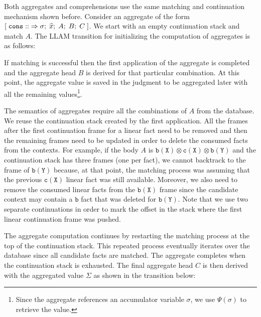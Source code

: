 Both aggregates and comprehensions use the same matching and continuation
mechanism shown before.  Consider an aggregate of the form
$[\; \mathtt{cons ::} \Rightarrow \sigma; \; \widehat{x}; \; A; \; B; \; C \;]$. We start with an
empty continuation stack and match $A$.  The LLAM transition for initializing
the computation of aggregates is as follows:



If matching is successful then the first application of the aggregate is
completed and the aggregate head $B$ is derived for that particular combination.
At this point, the aggregate value is saved in the judgment to be aggregated
later with all the remaining values\footnote{Since the aggregate references an
accumulator variable $\sigma$, we use $\Psi(\sigma)$ to retrieve the value.}.

The semantics of aggregates require all the combinations of $A$ from
the database. We reuse the continuation stack created by the first
application. All the frames after the first continuation frame for a linear fact
need to be removed and then the remaining frames need to be updated in order to
delete the consumed facts from the contexts. For example, if the body $A$ is
$\mathtt{b(X)} \otimes \mathtt{c(X)} \otimes \mathtt{b(Y)}$ and the continuation
stack has three frames (one per fact), we cannot backtrack to the frame of
$\mathtt{b(Y)}$ because, at that point, the matching process was assuming that
the previous $\mathtt{c(X)}$ linear fact was still available.  Moreover, we also
need to remove the consumed linear facts from the $\mathtt{b(X)}$ frame
since the candidate context may contain a $\mathtt{b}$ fact that was deleted
for $\mathtt{b(Y)}$. Note that we use two separate continuations in order to
mark the offset in the stack where the first linear continuation frame was
pushed.

The aggregate computation continues by restarting the matching process at the
top of the continuation stack. This repeated process eventually iterates over
the database since all candidate facts are matched. The aggregate completes
when the continuation stack is exhausted. The final aggregate head $C$ is
then derived with the aggregated value $\Sigma$ as shown in the transition
below:


